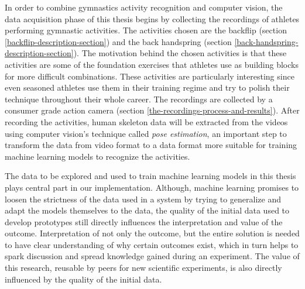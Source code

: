In order to combine gymnastics activity recognition and computer vision, the data acquisition phase of this thesis begins by collecting the recordings of athletes performing gymnastic activities. The activities chosen are the backflip (section \ref{backflip-description-section}) and the back handspring (section \ref{back-handspring-description-section}). The motivation behind the chosen activities is that these activities are some of the foundation exercises that athletes use as building blocks for more difficult combinations. These activities are particularly interesting since even seasoned athletes use them in their training regime and try to polish their technique throughout their whole career. The recordings are collected by a consumer grade action camera (section \ref{the-recordings-process-and-results}). After recording the activities, human skeleton data will be extracted from the videos using computer vision's technique called \textit{pose estimation}, an important step to transform the data from video format to a data format more suitable for training machine learning models to recognize the activities.

The data to be explored and used to train machine learning models in this thesis plays central part in our implementation. Although, machine learning promises to loosen the strictness of the data used in a system by trying to generalize and adapt the models themselves to the data, the quality of the initial data used to develop prototypes still directly influences the interpretation and value of the outcome. Interpretation of not only the outcome, but the entire solution is needed to have clear understanding of why certain outcomes exist, which in turn helps to spark discussion and spread knowledge gained during an experiment. The value of this research, reusable by peers for new scientific experiments, is also directly influenced by the quality of the initial data. 


